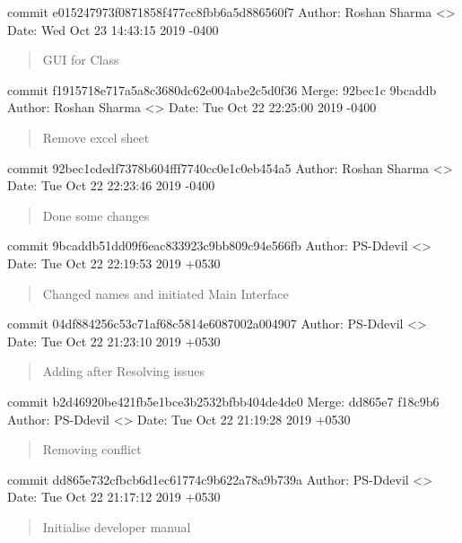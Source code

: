 \documentclass[letterpaper,10pt,english]{sphinxmanual}
\begin{document}
commit e015247973f0871858f477cc8fbb6a5d886560f7
Author: Roshan Sharma \textless{}\textgreater{}
Date:   Wed Oct 23 14:43:15 2019 -0400
\begin{quote}

GUI for Class
\end{quote}

commit f1915718e717a5a8c3680dc62e004abe2c5d0f36
Merge: 92bec1c 9bcaddb
Author: Roshan Sharma \textless{}\textgreater{}
Date:   Tue Oct 22 22:25:00 2019 -0400
\begin{quote}

Remove excel sheet
\end{quote}

commit 92bec1cdedf7378b604fff7740cc0e1c0eb454a5
Author: Roshan Sharma \textless{}\textgreater{}
Date:   Tue Oct 22 22:23:46 2019 -0400
\begin{quote}

Done some changes
\end{quote}

commit 9bcaddb51dd09f6eac833923c9bb809c94e566fb
Author: PS-Ddevil \textless{}\textgreater{}
Date:   Tue Oct 22 22:19:53 2019 +0530
\begin{quote}

Changed names and initiated Main Interface
\end{quote}

commit 04df884256c53c71af68c5814e6087002a004907
Author: PS-Ddevil \textless{}\textgreater{}
Date:   Tue Oct 22 21:23:10 2019 +0530
\begin{quote}

Adding after Resolving issues
\end{quote}

commit b2d46920be421fb5e1bce3b2532bfbb404de4de0
Merge: dd865e7 f18c9b6
Author: PS-Ddevil \textless{}\textgreater{}
Date:   Tue Oct 22 21:19:28 2019 +0530
\begin{quote}

Removing conflict
\end{quote}

commit dd865e732cfbcb6d1ec61774c9b622a78a9b739a
Author: PS-Ddevil \textless{}\textgreater{}
Date:   Tue Oct 22 21:17:12 2019 +0530
\begin{quote}

Initialise developer manual
\end{quote}
\end{document}
